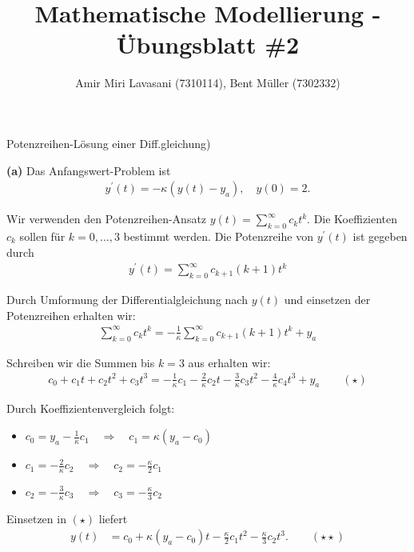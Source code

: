 \documentclass[10pt]{article}
\newenvironment{Aufgabe}[2][Aufgabe]{\begin{trivlist}
\item[\hskip \labelsep {\bfseries #1}\hskip \labelsep {\bfseries #2.}]}{\end{trivlist}}
\begin{document}
 
\title{ \textbf{Mathematische Modellierung - Übungsblatt \#2} }

\author{Amir Miri Lavasani (7310114), Bent Müller (7302332)} \maketitle

 
\begin{Aufgabe}{4}
    (Potenzreihen-Lösung einer Diff.gleichung)
\end{Aufgabe}

\textbf{(a)} Das Anfangswert-Problem ist 
  \begin{align*}
    y^\prime(t) = -\kappa(y(t) - y_a), \quad y(0) = 2.
  \end{align*}
  
  Wir verwenden den Potenzreihen-Ansatz $y(t) = \sum_{k=0}^{\infty} c_k t^k$. Die Koeffizienten $c_k$ sollen 
  für $k=0,\dots,3$ bestimmt werden. Die Potenzreihe von $y^\prime(t)$ ist gegeben durch 
  \begin{align*}
    y^\prime(t) = \sum_{k=0}^{\infty} c_{k+1}(k+1) t^k
  \end{align*}

  Durch Umformung der Differentialgleichung nach $y(t)$ und einsetzen der Potenzreihen erhalten wir:
  \begin{align*}
    \sum_{k=0}^{\infty} c_k t^k = -\frac{1}{\kappa} \sum_{k=0}^{\infty} c_{k+1}(k+1) t^k + y_a
  \end{align*}

  Schreiben wir die Summen bis $k=3$ aus erhalten wir:
  \begin{align*}
    c_0 + c_1t + c_2t^2 + c_3t^3 = -\frac{1}{\kappa}c_1 - \frac{2}{\kappa}c_2t 
                                   - \frac{3}{\kappa}c_3t^2 - \frac{4}{\kappa}c_4t^3 + y_a  \qquad(\star)
  \end{align*}

  Durch Koeffizientenvergleich folgt:
  \begin{itemize}
    \item[-] $c_0 = y_a - \frac{1}{\kappa}c_1 \quad\Rightarrow\quad c_1 = \kappa(y_a - c_0)$
    \item[-] $c_1 = -\frac{2}{\kappa}c_2 \quad\Rightarrow\quad c_2 = -\frac{\kappa}{2} c_1$
    \item[-] $c_2 = -\frac{3}{\kappa} c_3 \quad\Rightarrow\quad c_3 = -\frac{\kappa}{3}c_2$ 
  \end{itemize}

  Einsetzen in $(\star)$ liefert
  \begin{align*}
    y(t) &= c_0 + \kappa(y_a - c_0) t - \frac{\kappa}{2} c_1 t^2 - \frac{\kappa}{3}c_2 t^3. \qquad (\star\star) \\
  \end{align*}
\end{document}
